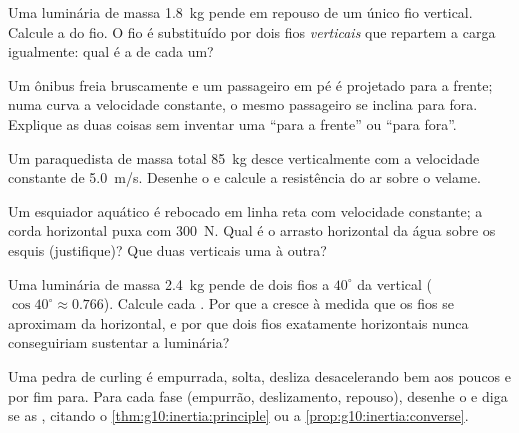 \begin{exercise}[$\star\star$]\label{exo:g10:inertia:8}
Uma luminária de massa \qty{1.8}{kg} pende em repouso de um único fio
vertical. Calcule a  do fio. O fio é substituído por dois fios
\emph{verticais} que repartem a carga igualmente: qual é a  de cada
um?
\end{exercise}

\begin{exercise}[$\star\star$]\label{exo:g10:inertia:9}
Um ônibus freia bruscamente e um passageiro em pé é projetado para a
frente; numa curva a velocidade constante, o mesmo passageiro se inclina
para fora. Explique as duas coisas sem inventar uma  ``para a
frente'' ou ``para fora''.
\end{exercise}

\begin{exercise}[$\star\star$]\label{exo:g10:inertia:10}
Um paraquedista de massa total \qty{85}{kg} desce verticalmente com a
velocidade constante de \qty{5.0}{m/s}. Desenhe o  e
calcule a resistência do ar sobre o velame.
\end{exercise}

\begin{exercise}[$\star\star$]\label{exo:g10:inertia:11}
Um esquiador aquático é rebocado em linha reta com velocidade constante;
a corda horizontal puxa com \qty{300}{N}. Qual é o arrasto horizontal da
água sobre os esquis (justifique)? Que duas  verticais 
uma à outra?
\end{exercise}

\begin{exercise}[$\star\star\star$]\label{exo:g10:inertia:12}
Uma luminária de massa \qty{2.4}{kg} pende de dois fios a $40^\circ$ da
vertical ($\cos 40^\circ \approx 0.766$). Calcule cada . Por que a
 cresce à medida que os fios se aproximam da horizontal, e por que
dois fios exatamente horizontais nunca conseguiriam sustentar a
luminária?
\end{exercise}

\begin{exercise}[$\star\star\star$]\label{exo:g10:inertia:13}
Uma pedra de curling é empurrada, solta, desliza desacelerando bem aos
poucos e por fim para. Para cada fase (empurrão, deslizamento, repouso),
desenhe o  e diga se as  , citando o
\cref{thm:g10:inertia:principle} ou a
\cref{prop:g10:inertia:converse}.
\end{exercise}

